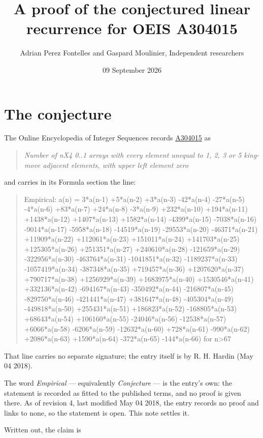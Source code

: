 \documentclass[11pt]{article}
\title{A proof of the conjectured linear recurrence for OEIS A304015}
\author{Adrian Perez Fontelles and Gaspard Moulinier, Independent researchers}
\date{09 September 2026}
\theoremstyle{definition}
\begin{document}
\maketitle
\section{The conjecture}

The Online Encyclopedia of Integer Sequences records \href{https://oeis.org/A304015}{A304015} as

\begin{quote}\itshape Number of nX4 0..1 arrays with every element unequal to 1, 2, 3 or 5 king-move adjacent elements, with upper left element zero\end{quote}

and carries in its Formula section the line:

\begin{quote}\ttfamily Empirical: a(n) = 3*a(n-1) +5*a(n-2) +3*a(n-3) -42*a(n-4) -27*a(n-5) -4*a(n-6) +83*a(n-7) +24*a(n-8) -3*a(n-9) +232*a(n-10) +194*a(n-11) +1438*a(n-12) +1407*a(n-13) +1582*a(n-14) -4399*a(n-15) -7038*a(n-16) -9014*a(n-17) -5958*a(n-18) -14519*a(n-19) -29553*a(n-20) -46371*a(n-21) +11909*a(n-22) +112061*a(n-23) +151011*a(n-24) +141703*a(n-25) +125305*a(n-26) +251351*a(n-27) +240610*a(n-28) -121659*a(n-29) -322956*a(n-30) -463764*a(n-31) -1041851*a(n-32) -1189237*a(n-33) -1057419*a(n-34) -387348*a(n-35) +719457*a(n-36) +1207620*a(n-37) +790717*a(n-38) +1256929*a(n-39) +1683975*a(n-40) +1530546*a(n-41) +332136*a(n-42) -694167*a(n-43) -350492*a(n-44) -216807*a(n-45) -829750*a(n-46) -421441*a(n-47) +381647*a(n-48) -405304*a(n-49) -449818*a(n-50) +255431*a(n-51) +186823*a(n-52) -168805*a(n-53) +68643*a(n-54) +106160*a(n-55) -24046*a(n-56) -12538*a(n-57) +6066*a(n-58) -6206*a(n-59) -12632*a(n-60) +728*a(n-61) -990*a(n-62) +2086*a(n-63) +1590*a(n-64) -372*a(n-65) -144*a(n-66) for n>67\end{quote}

That line carries no separate signature; the entry itself is by R. H. Hardin (May 04 2018).

The word {\itshape Empirical} --- equivalently {\itshape Conjecture} --- is the entry's own: the statement is recorded as fitted to the published terms, and no proof is given there. As of revision 4, last modified May 04 2018, the entry records no proof and links to none, so the statement is open. This note settles it.

Written out, the claim is
\end{document}

